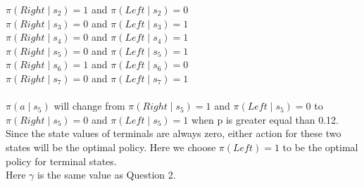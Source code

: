 \documentclass[12pt]{article}
\begin{document}
\begin{enumerate}
$\pi(Right \mid s_2) = 1$ and $\pi(Left\mid s_2) = 0$\\
$\pi(Right \mid s_3) = 0$ and $\pi(Left\mid s_3) = 1$\\
$\pi(Right \mid s_4) = 0$ and $\pi(Left\mid s_4) = 1$\\
$\pi(Right \mid s_5) = 0$ and $\pi(Left\mid s_5) = 1$\\
$\pi(Right \mid s_6) = 1$ and $\pi(Left\mid s_6) = 0$\\
$\pi(Right \mid s_7) = 0$ and $\pi(Left\mid s_7) = 1$\\\\
$\pi(a \mid s_5)$ will change from $\pi(Right \mid s_5) = 1$ and $\pi(Left\mid s_5) = 0$ to $\pi(Right\mid s_5) = 0$ and $\pi(Left\mid s_5) = 1$ when p is greater equal than 0.12.\\
Since the state values of terminals are always zero, either action for these two states will be the optimal policy. Here we choose $\pi(Left) = 1$ to be the optimal policy for terminal states.\\
Here $\gamma$ is the same value as Question 2.\\
\end{enumerate}
\end{document}
